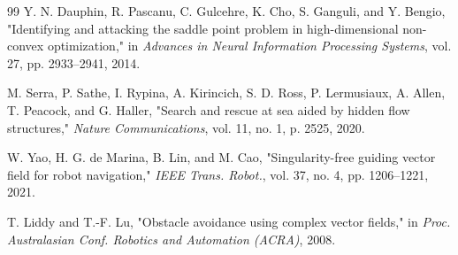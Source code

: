 \documentclass[lettersize,journal]{IEEEtran}
\begin{document}
\begin{thebibliography}{99}
 Y. N. Dauphin, R. Pascanu, C. Gulcehre, K. Cho, S. Ganguli,
and Y. Bengio, "Identifying and attacking the saddle point problem in
high-dimensional non-convex optimization," in \textit{Advances in Neural
Information Processing Systems}, vol. 27, pp. 2933--2941, 2014.

 M. Serra, P. Sathe, I. Rypina, A. Kirincich, S. D. Ross,
P. Lermusiaux, A. Allen, T. Peacock, and G. Haller, "Search and rescue
at sea aided by hidden flow structures," \textit{Nature Communications},
vol. 11, no. 1, p. 2525, 2020.

 W. Yao, H. G. de Marina, B. Lin, and M. Cao,
"Singularity-free guiding vector field for robot navigation,"
\textit{IEEE Trans. Robot.}, vol. 37, no. 4, pp. 1206--1221, 2021.

 T. Liddy and T.-F. Lu, "Obstacle avoidance using complex
vector fields," in \textit{Proc. Australasian Conf. Robotics and
Automation (ACRA)}, 2008.

\end{thebibliography}
\end{document}
